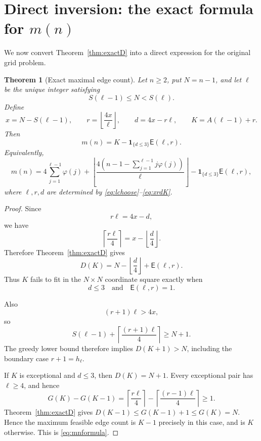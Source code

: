 \documentclass[11pt]{article}
\newtheorem{theorem}{Theorem}[section]
\theoremstyle{definition}
\newcommand{\E}{\mathsf E}
\newcommand{\one}{\mathbf 1}
\newcommand{\ph}{\varphi}
\begin{document}
\section{Direct inversion: the exact formula for \(m(n)\)}

We now convert Theorem~\ref{thm:exactD} into a direct expression for the original grid problem.

\begin{theorem}[Exact maximal edge count]\label{thm:mn}
Let \(n\ge2\), put \(N=n-1\), and let \(\ell\) be the unique integer satisfying
\begin{equation}\label{eq:lchoose}
S(\ell-1)\le N<S(\ell).
\end{equation}
Define
\begin{equation}\label{eq:xrdK}
x=N-S(\ell-1),\qquad
r=\left\lfloor\frac{4x}{\ell}\right\rfloor,\qquad
d=4x-r\ell,\qquad
K=A(\ell-1)+r.
\end{equation}
Then
\begin{equation}\label{eq:mnformula}
\boxed{
m(n)=K-\one_{\{d\le3\}}\E(\ell,r).
}
\end{equation}
Equivalently,
\[
\boxed{
m(n)
=
4\sum_{j=1}^{\ell-1}\ph(j)
+
\left\lfloor
\frac{4\left(n-1-\sum_{j=1}^{\ell-1}j\ph(j)\right)}{\ell}
\right\rfloor
-
\one_{\{d\le3\}}\E(\ell,r),
}
\]
where \(\ell,r,d\) are determined by \eqref{eq:lchoose}--\eqref{eq:xrdK}.
\end{theorem}

\begin{proof}
Since
\[
r\ell=4x-d,
\]
we have
\[
\left\lceil\frac{r\ell}{4}\right\rceil
=
x-\left\lfloor\frac d4\right\rfloor.
\]
Therefore Theorem~\ref{thm:exactD} gives
\begin{equation}\label{eq:DK}
D(K)
=
N-\left\lfloor\frac d4\right\rfloor+\E(\ell,r).
\end{equation}
Thus \(K\) fails to fit in the \(N\times N\) coordinate square exactly when
\[
d\le3\quad\text{and}\quad \E(\ell,r)=1.
\]

Also
\[
(r+1)\ell>4x,
\]
so
\[
S(\ell-1)+\left\lceil\frac{(r+1)\ell}{4}\right\rceil\ge N+1.
\]
The greedy lower bound therefore implies \(D(K+1)>N\), including the boundary case
\(r+1=h_\ell\).

If \(K\) is exceptional and \(d\le3\), then \(D(K)=N+1\).  Every exceptional pair has
\(\ell\ge4\), and hence
\[
G(K)-G(K-1)
=
\left\lceil\frac{r\ell}{4}\right\rceil
-
\left\lceil\frac{(r-1)\ell}{4}\right\rceil
\ge1.
\]
Theorem~\ref{thm:exactD} gives \(D(K-1)\le G(K-1)+1\le G(K)=N\).
Hence the maximum feasible edge count is \(K-1\) precisely in this case, and is \(K\) otherwise.  This is \eqref{eq:mnformula}.
\end{proof}
\end{document}
